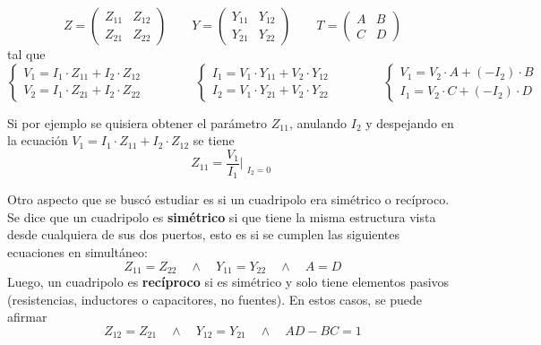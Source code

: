 \begin{equation*}
    Z  =
    \begin{pmatrix}
        Z_{11} & Z_{12} \\
        Z_{21} & Z_{22}
    \end{pmatrix}
    \qquad Y = 
    \begin{pmatrix}
        Y_{11} & Y_{12} \\
        Y_{21} & Y_{22}
    \end{pmatrix}
    \qquad T = 
    \begin{pmatrix}
        A & B \\
        C & D
    \end{pmatrix}
\end{equation*}
tal que
\begin{equation*}
    \begin{cases}
        V_1 = I_1 \cdot Z_{11} + I_2 \cdot Z_{12} \\ 
        V_2 = I_1 \cdot Z_{21} + I_2 \cdot Z_{22}
    \end{cases}
    \qquad \qquad
    \begin{cases}
        I_1 = V_1 \cdot Y_{11} + V_2 \cdot Y_{12} \\ 
        I_2 = V_1 \cdot Y_{21} + V_2 \cdot Y_{22}
    \end{cases}
    \qquad \qquad
    \begin{cases}
        V_1 = V_2 \cdot A + (-I_2) \cdot B \\ 
        I_1 = V_2 \cdot C + (-I_2) \cdot D
    \end{cases}
\end{equation*}

Si por ejemplo se quisiera obtener el parámetro $ Z_{11} $, anulando $ I_2$ y despejando en la ecuación $ V_1 = I_1 \cdot Z_{11} + I_2 \cdot Z_{12} $ se tiene
\begin{equation*}
    Z_{11} = \frac{V_1}{I_1} \Biggr|_{\substack{I_2=0}} %
\end{equation*}

\par Otro aspecto que se buscó estudiar es si un cuadripolo era simétrico o recíproco. Se dice que un cuadripolo es \textbf{simétrico} si que tiene la misma
estructura vista desde cualquiera de sus dos puertos, esto es si se cumplen las siguientes ecuaciones en simultáneo:
\begin{equation*}
    Z_{11}=Z_{22} \quad \wedge \quad Y_{11}=Y_{22} \quad \wedge \quad A=D
\end{equation*}
Luego, un cuadripolo es \textbf{recíproco} si es simétrico y solo tiene elementos pasivos (resistencias, inductores o capacitores, no 
fuentes). En estos casos, se puede afirmar
\begin{equation*}
    Z_{12}=Z_{21} \quad \wedge \quad Y_{12}=Y_{21} \quad \wedge \quad AD-BC=1
\end{equation*}

